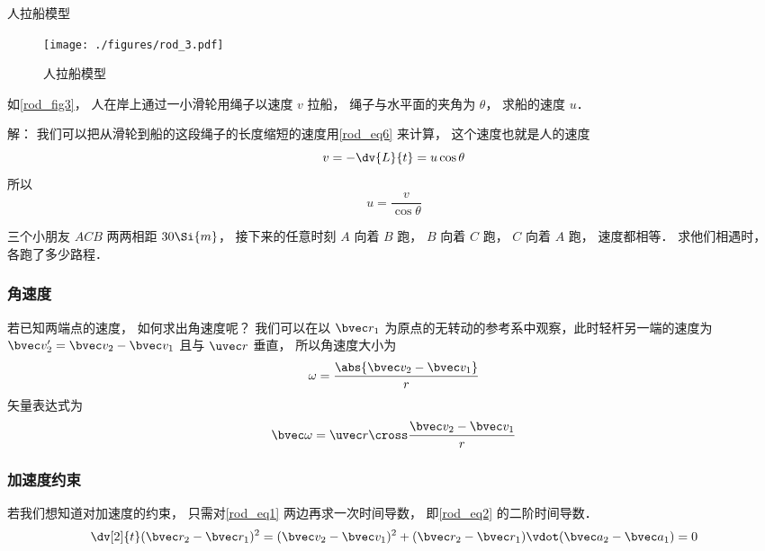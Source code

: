 \begin{example}{人拉船模型}
\begin{figure}[ht]
\centering
\texttt{[image: ./figures/rod\_3.pdf]}
\caption{人拉船模型} \label{rod_fig3}
\end{figure}
如\autoref{rod_fig3}， 人在岸上通过一小滑轮用绳子以速度 $v$ 拉船， 绳子与水平面的夹角为 $\theta$， 求船的速度 $u$．

解： 我们可以把从滑轮到船的这段绳子的长度缩短的速度用\autoref{rod_eq6} 来计算， 这个速度也就是人的速度
\begin{equation}
v = -\dv{L}{t} = u \cos\theta
\end{equation}
所以
\begin{equation}
u = \frac{v}{\cos\theta}
\end{equation}
\end{example}

\begin{exercise}{}
三个小朋友 $ACB$ 两两相距 $30\Si{m}$， 接下来的任意时刻 $A$ 向着 $B$ 跑， $B$ 向着 $C$ 跑， $C$ 向着 $A$ 跑， 速度都相等． 求他们相遇时， 各跑了多少路程．
\end{exercise}

\subsubsection{角速度}

若已知两端点的速度， 如何求出角速度呢？ 我们可以在以 $\bvec r_1$ 为原点的无转动的参考系中观察，此时轻杆另一端的速度为 $\bvec v_2' = \bvec v_2 - \bvec v_1$ 且与 $\uvec r$ 垂直， 所以角速度大小为
\begin{equation}\label{rod_eq8}
\omega = \frac{\abs{\bvec v_2 - \bvec v_1}}{r}
\end{equation}
矢量表达式为
\begin{equation}\label{rod_eq4}
\bvec \omega = \uvec r \cross \frac{\bvec v_2 - \bvec v_1}{r}
\end{equation}

\subsubsection{加速度约束}
若我们想知道对加速度的约束， 只需对\autoref{rod_eq1} 两边再求一次时间导数， 即\autoref{rod_eq2} 的二阶时间导数．
\begin{equation}
\dv[2]{t} (\bvec r_2 - \bvec r_1)^2 = (\bvec v_2 - \bvec v_1)^2 + (\bvec r_2 - \bvec r_1) \vdot (\bvec a_2 - \bvec a_1) = 0
\end{equation}

